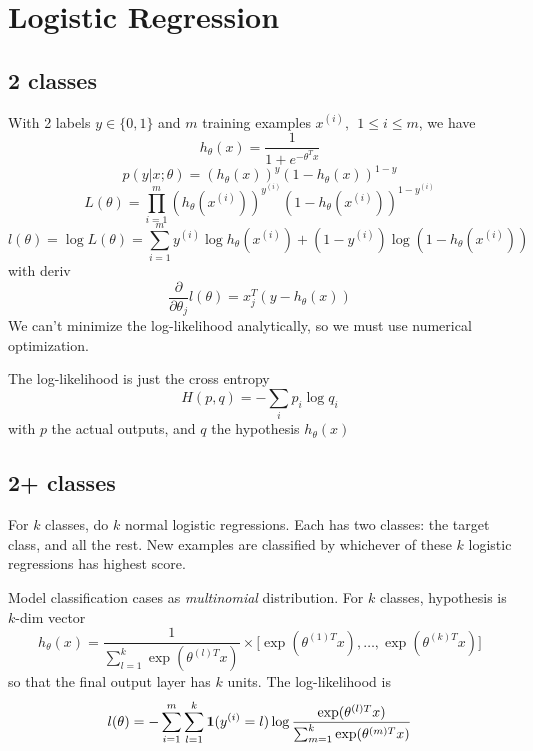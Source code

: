 \documentclass[11pt]{article}
\begin{document}
\section{Logistic Regression}
\label{sec:logreg}
\subsection{2 classes}
With 2 labels $y \in \{0,1\}$ and $m$ training examples $x^{(i)},\ \ 1 \leq i \leq m$,
we have
\begin{equation}
  h_\theta (x) = \frac{1}{1 + e^{-\theta^T x}}
\end{equation}
\begin{equation}
  p(y|x;\theta) = (h_\theta (x))^y (1 - h_\theta (x))^{1-y}
\end{equation}
\begin{equation}
  L(\theta) = \prod_{i=1}^m (h_\theta (x^{(i)}))^{y^{(i)}} (1 - h_\theta
  (x^{(i)}))^{1-y^{(i)}}
\end{equation}
\begin{equation}
  l(\theta) = \log L(\theta) = \sum_{i=1}^m y^{(i)} \log h_\theta (x^{(i)}) + (1 -
  y^{(i)}) \log(1 - h_\theta  (x^{(i)}))
\end{equation}
with deriv
\begin{equation}
  \frac{\partial}{\partial \theta_j} l(\theta) = x_j^T (y - h_\theta (x))
\end{equation}
We can't minimize the log-likelihood analytically, so we must use numerical
optimization.

The log-likelihood is just the cross entropy
\begin{equation}
  H(p,q) = -\sum_i p_i \log q_i
\end{equation}
with $p$ the actual outputs, and $q$ the hypothesis $h_\theta(x)$

\subsection{2+ classes}

 For $k$ classes, do $k$ normal logistic regressions. Each has two
classes: the target class, and all the rest. New examples are classified by whichever of
these $k$ logistic regressions has highest score.

 Model classification cases as \emph{multinomial}
distribution. For $k$ classes, hypothesis is $k$-dim vector
\begin{equation}
  h_\theta (x) = \frac{1}{\sum_{l=1}^k \exp(\theta^{(l)T} x)} \times
  \big[\exp(\theta^{(1)T} x), \dots, \exp(\theta^{(k)T} x)\big] 
\end{equation}
so that the final output layer has $k$ units. The log-likelihood is
\begin{equation}
  l(\theta) = - \sum_{i=1}^m \sum_{l=1}^k \mathbf{1}(y^{(i)} = l)
  \log \frac{\exp(\theta^{(l)T} x)}{\sum_{m=1}^k \exp(\theta^{(m)T} x)} 
\end{equation}
\end{document}
